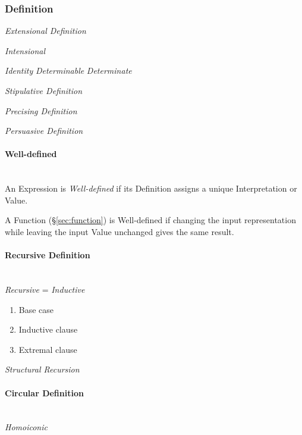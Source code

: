 \subsubsection{Definition}\label{sec:definition}

\emph{Extensional Definition}

\emph{Intensional}

\emph{Identity} \emph{Determinable} \emph{Determinate}

\emph{Stipulative Definition}

\emph{Precising Definition}

\emph{Persuasive Definition}



\paragraph{Well-defined}\label{sec:well_defined}
\hfill \\

An Expression is \emph{Well-defined} if its Definition assigns a
unique Interpretation or Value.

A Function (\S\ref{sec:function}) is Well-defined if changing the
input representation while leaving the input Value unchanged gives the
same result.



\paragraph{Recursive Definition}\label{sec:recursive_definition}
\hfill \\

\emph{Recursive} = \emph{Inductive}

\begin{enumerate}
    \item Base case
    \item Inductive clause
    \item Extremal clause
\end{enumerate}

\emph{Structural Recursion}



\paragraph{Circular Definition}\label{sec:circular_definition}
\hfill \\

\emph{Homoiconic}



